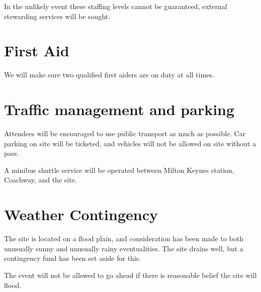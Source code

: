 In the unlikely event these staffing levels cannot be guaranteed, external stewarding services will be sought.

\section{First Aid}

We will make sure two qualified first aiders are on duty at all times.

\section{Traffic management and parking}

Attendees will be encouraged to use public transport as much as possible. Car parking on site will be ticketed,
and vehicles will not be allowed on site without a pass.

A minibus shuttle service will be operated between Milton Keynes station, Coachway, and the site.

\section{Weather Contingency}

The site is located on a flood plain, and consideration has been made to both unusually sunny and unusually rainy
eventualities. The site drains well, but a contingency fund has been set aside for this.

The event will not be allowed to go ahead if there is reasonable belief the site will flood.

